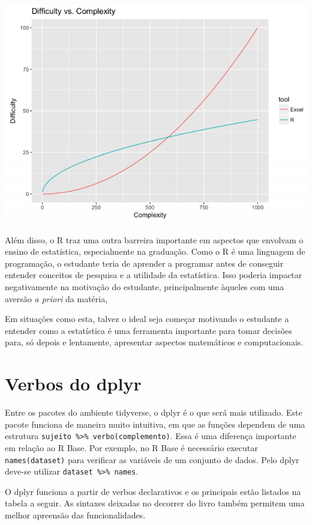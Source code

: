 \documentclass[
]{book}
\begin{document}
\includegraphics{./img/excel_r.PNG}

Além disso, o R traz uma outra barreira importante em aspectos que
envolvam o ensino de estatística, especialmente na graduação. Como o R é
uma linguagem de programação, o estudante teria de aprender a programar
antes de conseguir entender conceitos de pesquisa e a utilidade da
estatística. Isso poderia impactar negativamente na motivação do
estudante, principalmente àqueles com uma aversão \emph{a priori} da
matéria,

Em situações como esta, talvez o ideal seja começar motivando o
estudante a entender como a estatística é uma ferramenta importante para
tomar decisões para, só depois e lentamente, apresentar aspectos
matemáticos e computacionais.

\hypertarget{verbos-do-dplyr}{%
\section{Verbos do dplyr}\label{verbos-do-dplyr}}

Entre os pacotes do ambiente tidyverse, o dplyr é o que será mais
utilizado. Este pacote funciona de maneira muito intuitiva, em que as
funções dependem de uma estrutura
\texttt{sujeito\ \%\textgreater{}\%\ verbo(complemento)}. Essa é uma
diferença importante em relação ao R Base. Por exemplo, no R Base é
necessário executar \texttt{names(dataset)} para verificar as variáveis
de um conjunto de dados. Pelo dplyr deve-se utilizar
\texttt{dataset\ \%\textgreater{}\%\ names}.

O dplyr funciona a partir de verbos declarativos e os principais estão
listados na tabela a seguir. As sintaxes deixadas no decorrer do livro
também permitem uma melhor apreensão das funcionalidades.
\end{document}
